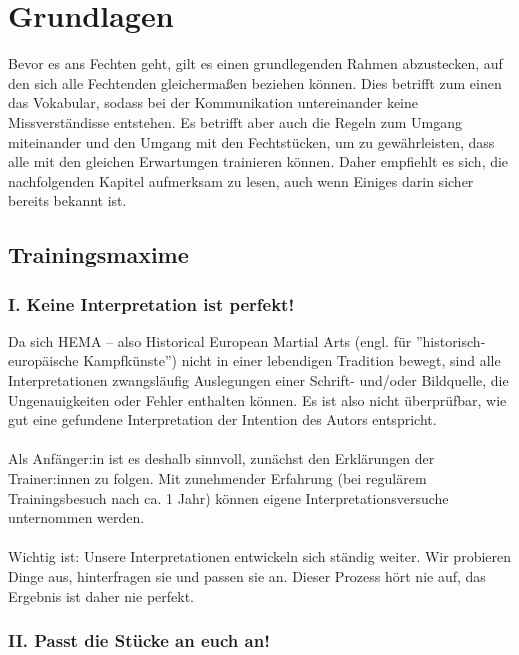 \newpage

\tableofcontents

\newpage
 
\section{Grundlagen}

Bevor es ans Fechten geht, gilt es einen grundlegenden Rahmen abzustecken, auf den sich alle Fechtenden gleichermaßen beziehen können. Dies betrifft zum einen das Vokabular, sodass bei der Kommunikation untereinander keine Missverständisse entstehen. Es betrifft aber auch die Regeln zum Umgang miteinander und den Umgang mit den Fechtstücken, um zu gewährleisten, dass alle mit den gleichen Erwartungen trainieren können. Daher empfiehlt es sich, die nachfolgenden Kapitel aufmerksam zu lesen, auch wenn Einiges darin sicher bereits bekannt ist.

\subsection{Trainingsmaxime}

\subsubsection*{I. Keine Interpretation ist perfekt!}

Da sich HEMA – also Historical European Martial Arts (engl. für ”historisch-europäische Kampfkünste”) nicht in einer lebendigen Tradition bewegt, sind alle Interpretationen zwangsläufig Auslegungen einer Schrift- und/oder Bildquelle, die Ungenauigkeiten oder Fehler enthalten können. Es ist also nicht überprüfbar, wie gut eine gefundene Interpretation der Intention des Autors entspricht.
\\
\\
Als Anfänger:in ist es deshalb sinnvoll, zunächst den Erklärungen der Trainer:innen zu
folgen. Mit zunehmender Erfahrung (bei regulärem Trainingsbesuch nach ca. 1 Jahr) können
eigene Interpretationsversuche unternommen werden.
\\
\\
Wichtig ist: Unsere Interpretationen entwickeln sich ständig weiter. Wir probieren Dinge aus,
hinterfragen sie und passen sie an. Dieser Prozess hört nie auf, das Ergebnis ist daher nie
perfekt.

\subsubsection*{II. Passt die Stücke an euch an!}

